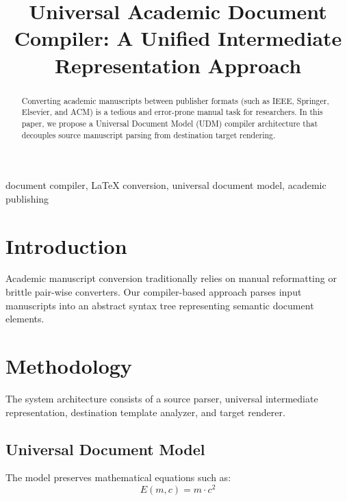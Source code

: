 \documentclass[conference]{IEEEtran}
\begin{document}
\title{Universal Academic Document Compiler: A Unified Intermediate Representation Approach}

\author{
\and
{}
}

\maketitle

\begin{abstract}
Converting academic manuscripts between publisher formats (such as IEEE, Springer, Elsevier, and ACM) is a tedious and error-prone manual task for researchers. In this paper, we propose a Universal Document Model (UDM) compiler architecture that decouples source manuscript parsing from destination target rendering.
\end{abstract}

\begin{IEEEkeywords}
document compiler, LaTeX conversion, universal document model, academic publishing
\end{IEEEkeywords}

\section{Introduction}
Academic manuscript conversion traditionally relies on manual reformatting or brittle pair-wise converters. Our compiler-based approach parses input manuscripts into an abstract syntax tree representing semantic document elements.

\section{Methodology}
The system architecture consists of a source parser, universal intermediate representation, destination template analyzer, and target renderer.

\subsection{Universal Document Model}
The model preserves mathematical equations such as:
\begin{equation}
E(m, c) = m \cdot c^2
\label{eq:einstein}
\end{equation}
\end{document}
